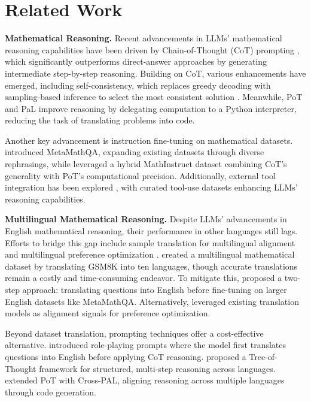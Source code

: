 \section{Related Work}

\textbf{Mathematical Reasoning.}
%
Recent advancements in LLMs' mathematical reasoning capabilities have been driven by Chain-of-Thought (CoT) prompting \cite{og-cot-prompt, scratchpadNye}, which significantly outperforms direct-answer approaches by generating intermediate step-by-step reasoning.
%
Building on CoT, various enhancements have emerged, including self-consistency, which replaces greedy decoding with sampling-based inference to select the most consistent solution \cite{wang2023selfconsistency}.
Meanwhile, PoT and PaL \cite{pot, pal} improve reasoning by delegating computation to a Python interpreter, reducing the task of translating problems into code.
%

Another key advancement is instruction fine-tuning on mathematical datasets.
%
\citet{metamath} introduced MetaMathQA, expanding existing datasets through diverse rephrasings, while \citet{mammoth} leveraged a hybrid MathInstruct dataset combining CoT’s generality with PoT’s computational precision.
%
Additionally, external tool integration has been explored \cite{mario, tora}, with curated tool-use datasets enhancing LLMs’ reasoning capabilities.
%

\textbf{Multilingual Mathematical Reasoning.}
%
Despite LLMs' advancements in English mathematical reasoning, their performance in other languages still lags.
%
Efforts to bridge this gap include sample translation for multilingual alignment \cite{mathoctopus, mcot, qalign} and multilingual preference optimization \cite{mapo}.
%
\citet{mathoctopus} created a multilingual mathematical dataset by translating GSM8K into ten languages, though accurate translations remain a costly and time-consuming endeavor.
%
To mitigate this, \citet{qalign} proposed a two-step approach: translating questions into English before fine-tuning on larger English datasets like MetaMathQA.
%
Alternatively, \citet{mapo} leveraged existing translation models as alignment signals for preference optimization.
%

Beyond dataset translation, prompting techniques offer a cost-effective alternative.
%
\citet{not-all-lang-cross-lingual-cot-prompt} introduced role-playing prompts where the model first translates questions into English before applying CoT reasoning.
%
\citet{tot-multi-prompt} proposed a Tree-of-Thought framework for structured, multi-step reasoning across languages.
%
\citet{crosspal} extended PoT with Cross-PAL, aligning reasoning across multiple languages through code generation.

